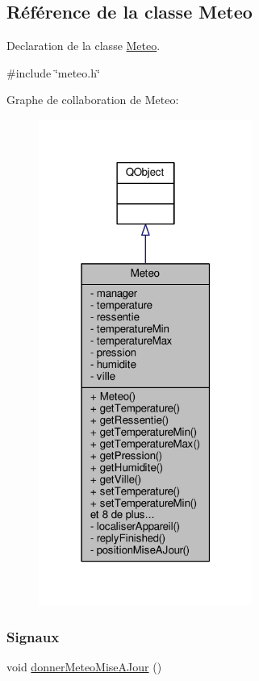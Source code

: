 \hypertarget{class_meteo}{}\subsection{Référence de la classe Meteo}
\label{class_meteo}


Declaration de la classe \hyperlink{class_meteo}{Meteo}.  




{\ttfamily \#include \char`\"{}meteo.\+h\char`\"{}}



Graphe de collaboration de Meteo\+:
\nopagebreak
\begin{figure}[H]
\begin{center}
\leavevmode
\includegraphics[width=199pt]{class_meteo__coll__graph}
\end{center}
\end{figure}
\subsubsection*{Signaux}
\begin{DoxyCompactItemize}
\item 
void \hyperlink{class_meteo_ab58994e421e7f44a81bd802c6b167cfb}{donner\+Meteo\+Mise\+A\+Jour} ()
\end{DoxyCompactItemize}
